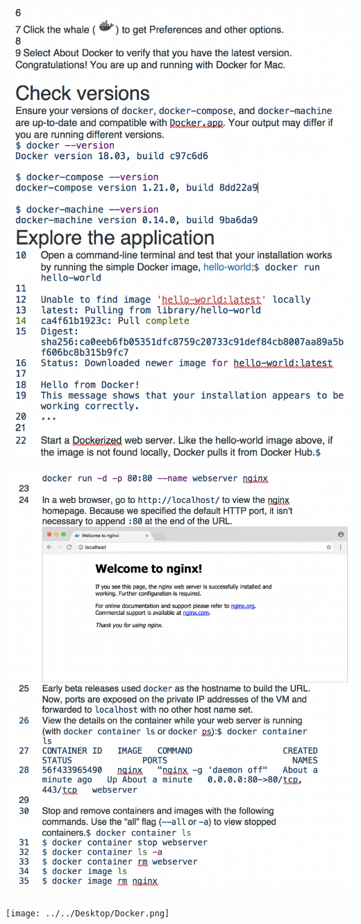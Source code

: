 \documentclass[12pt, letterpaper]{article}
\begin{document}
\includegraphics[width=1\textwidth, right]{Install Docker3.png}
\includegraphics[width=1\textwidth, right]{Install Docker4.png}

\texttt{[image: ../../Desktop/Docker.png]}




\end{document}
